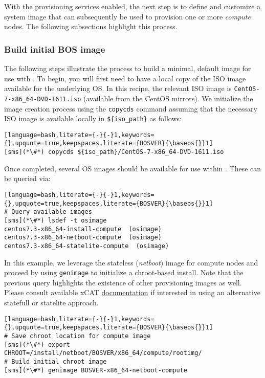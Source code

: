 
With the provisioning services enabled, the next step is to define and customize a system image that can subsequently be
used to provision one or more {\em compute} nodes. The following subsections highlight this process.

\subsubsection{Build initial BOS image} \label{sec:assemble_bos}
The following steps illustrate the process to build a minimal, default image for use with \xCAT{}. To begin, you will
first need to have a local copy of the ISO image available for the underlying OS. In this recipe, the relevant ISO image
is \texttt{CentOS-7-x86\_64-DVD-1611.iso} (available from the CentOS mirrors). We initialize the image
creation process using the \texttt{copycds} command assuming that the necessary ISO image is available locally in 
\texttt{\$\{iso\_path\}} as follows:

\begin{lstlisting}[language=bash,literate={-}{-}1,keywords={},upquote=true,keepspaces,literate={BOSVER}{\baseos{}}1]
[sms](*\#*) copycds ${iso_path}/CentOS-7-x86_64-DVD-1611.iso
\end{lstlisting}

\noindent Once completed, several OS images should be available for use within \xCAT{}. These can be queried via:

\begin{lstlisting}[language=bash,literate={-}{-}1,keywords={},upquote=true,keepspaces,literate={BOSVER}{\baseos{}}1]
# Query available images
[sms](*\#*) lsdef -t osimage
centos7.3-x86_64-install-compute  (osimage)
centos7.3-x86_64-netboot-compute  (osimage)
centos7.3-x86_64-statelite-compute  (osimage)
\end{lstlisting}

In this example, we leverage the stateless ({\em netboot}) image for compute nodes and proceed by using
\texttt{genimage} to initialize a chroot-based install. Note that the previous query highlights the existence of other
provisioning images as well. Please consult available xCAT
\href{https://xcat-docs.readthedocs.io/en/stable/}{\color{blue} documentation} if interested in using an alternative
statefull or statelite approach.

\begin{lstlisting}[language=bash,literate={-}{-}1,keywords={},upquote=true,keepspaces,literate={BOSVER}{\baseos{}}1]
# Save chroot location for compute image
[sms](*\#*) export CHROOT=/install/netboot/BOSVER/x86_64/compute/rootimg/
# Build initial chroot image
[sms](*\#*) genimage BOSVER-x86_64-netboot-compute
\end{lstlisting}
